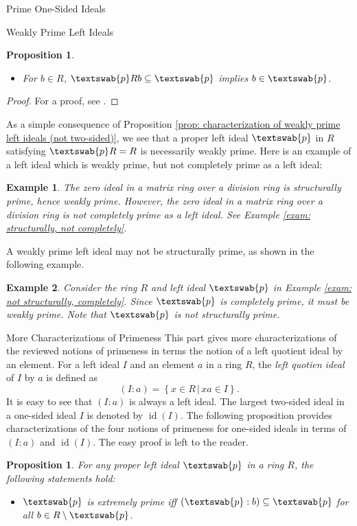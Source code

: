 \documentclass[11pt,a4paper]{article}
\theoremstyle{theorem}
\newtheorem{proposition}[theorem]{Proposition}
\newtheorem{example}{Example}[section]
\numberwithin{equation}{section}
\begin{document}
\begin{section}{Prime One-Sided Ideals}
\begin{subsection}{Weakly Prime Left Ideals}
\begin{proposition}
\begin{itemize}
			\item[(3)]  For \( b \in R \), \( \textswab{p}Rb \subseteq \textswab{p} \) implies \( b \in \textswab{p} \).
		\end{itemize}
	\end{proposition}
	\begin{proof}
		For a proof, see \cite[Proposition 1.3]{van1985weakly}.
	\end{proof}
	 As a simple consequence of  Proposition \ref{prop: characterization of weakly prime left ideals (not two-sided)}, we see that a proper left ideal \( \textswab{p}\) in \(R\) satisfying \( \textswab{p}R = R\) is necessarily weakly prime. Here is an example of a left ideal which is weakly prime, but not completely prime as a left ideal: 
	 \begin{example}
	 	\label{exam: weakly, not completely}
		The zero ideal in a matrix ring over a division ring is structurally prime, hence weakly prime.   However, the zero ideal  in a matrix ring over a division ring is not completely prime as a left ideal. See Example \ref{exam: structurally, not completely}.  
	 \end{example}
	 A weakly prime left ideal may not be structurally prime, as shown in the following  example. 
	 \begin{example}
	 	\label{exam: weakly, not structurally}
	 	Consider the ring \(R\) and left ideal \(\textswab{p}\) in Example \ref{exam: not structurally, completely}. Since \(\textswab{p}\) is completely prime, it must be weakly prime. Note that \(\textswab{p}\) is not structurally prime. 
	 \end{example}
\end{subsection}
\begin{subsection}{More Characterizations of Primeness} 
	This part gives more characterizations of the reviewed notions of primeness in terms the notion of a left quotient ideal by an element. For a left ideal \(I\) and an element \(a\) in a ring \(R\), the \textit{left quotien ideal} of \(I\) by \(a\) is defined as
	\[
		(I:a) = \left\lbrace x\in R \,|\,  xa\in I\right\rbrace. 
	\]
	It is easy to see that \((I:a)\) is always a left ideal. The largest two-sided ideal in a one-sided ideal \(I\) is denoted by \(\operatorname{id}(I)\). The following proposition provides characterizations of the four notions of primeness for one-sided ideals in terms of \((I:a)\) and \(\operatorname{id}(I)\). The easy proof is left to the reader. 
	\begin{proposition}
		For any proper left ideal \(\textswab{p}\) in a ring \(R\), the following statements hold: 
		\begin{itemize}
			\item[(1)] \(\textswab{p}\) is extremely prime iff \((\textswab{p}:b)\subseteq \textswab{p}\) for all \(b\in R\setminus \textswab{p}\).
			

\end{itemize}
\end{proposition}
\end{subsection}
\end{section}
\end{document}
